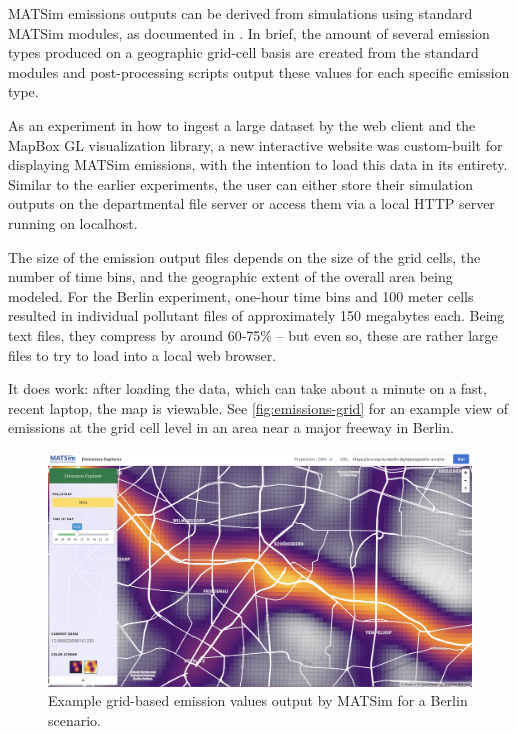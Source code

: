MATSim emissions outputs can be derived from simulations using standard MATSim modules, as documented in \cite{Kickhoefer2015EmissionModeling}. In brief, the amount of several emission types produced on a geographic grid-cell basis are created from the standard modules and post-processing scripts output these values for each specific emission type.

As an experiment in how to ingest a large dataset by the web client and the MapBox GL visualization library, a new interactive website was custom-built for displaying MATSim emissions, with the intention to load this data in its entirety. Similar to the earlier experiments, the user can either store their simulation outputs on the departmental file server or access them via a local HTTP server running on localhost.

The size of the emission output files depends on the size of the grid cells, the number of time bins, and the geographic extent of the overall area being modeled. For the Berlin experiment, one-hour time bins and 100 meter cells resulted in individual pollutant files of approximately 150 megabytes each. Being text files, they compress by around 60-75\% -- but even so, these are rather large files to try to load into a local web browser.

It does work: after loading the data, which can take about a minute on a fast, recent laptop, the map is viewable. See \autoref{fig:emissions-grid} for an example view of emissions at the grid cell level in an area near a major freeway in Berlin.

\begin{figure}[!ht]
  \includegraphics[width=\textwidth]{chapters/12-server-experiments/images/emissions-grid.png}
  \caption{Example grid-based emission values output by MATSim for a Berlin scenario.}
  \label{fig:emissions-grid}
\end{figure}

